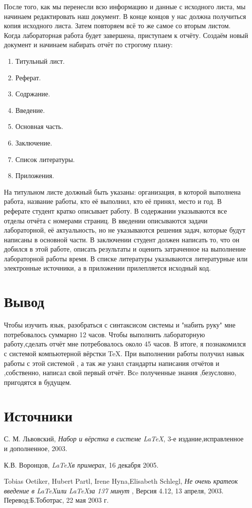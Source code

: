 \documentclass[a4paper,12pt]{article}
\begin{document}
После того, как мы перенесли всю информацию и данные с исходного листа, мы начинаем редактировать наш документ. В конце концов у нас должна получиться копия исходного листа. Затем повторяем всё то же самое со вторым листом. Когда лабораторная работа будет завершена, приступаем к отчёту. Создаём новый документ и начинаем набирать отчёт по строгому плану:
\begin{enumerate}
\item Титульный лист.
\item Реферат.
\item Содржание.
\item Введение.
\item Основная часть.
\item Заключение.
\item Список литературы.
\item Приложения.
\end{enumerate}
На титульном листе должный быть указаны: организация, в которой выполнена работа, название работы, кто её выполнил, кто её принял, место и год. В реферате студент кратко описывает работу. В содержании указываются все отделы отчёта с номерами страниц. В введении описываются задачи лабораторной, её актуальность, но не указываются решения задач, которые будут написаны в основной части. В заключении студент должен написать то, что он добился в этой работе, описать результаты и оценить затраченное на выполнение лабораторной работы время. В списке литературы указываются литературные или э\-лек\-трон\-ные источники, а в приложении прилепляется исходный код.

\newpage


\section{Вывод}
Чтобы изучить язык, разобраться с синтаксисом системы и "набить руку" мне потребовалось суммарно 12 часов. Чтобы выполнить лабораторную работу,сделать отчёт мне потребовалось около 45 часов. В итоге, я познакомился с системой компьютерной вёрстки TeX. При выполнении работы получил навык работы с этой системой , а так же узанл стандарты написания отчётов и ,собственно, написал свой первый отчёт. Всe полученные знания ,безусловно, пригодятся в будущем.

\newpage
\section{Источники}
\begin{thebibliography}{9}

		С. М. Львовский,
		\emph{Набор и вёрстка в системе \LaTeX},
		3-е издание,исправленное и дополненное, 2003.

		К.В. Воронцов,
		\emph{\LaTeX  в примерах},
		16 декабря 2005.
	
		Tobias Oetiker, Hubert Partl, Irene Hyna,Elisabeth Schlegl,
		\emph{Не очень кратеок введение в \LaTeX  или \LaTeX  за 137 минут },
		Версия 4.12, 13 апреля, 2003. Перевод:Б.Тоботрас, 22 мая 2003 г.

\end{thebibliography}
\end{document}
